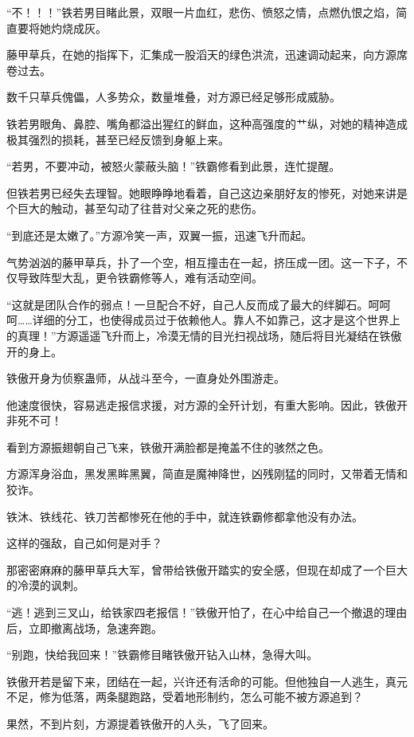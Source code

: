 \begin{this_body}
“不！！！”铁若男目睹此景，双眼一片血红，悲伤、愤怒之情，点燃仇恨之焰，简直要将她灼烧成灰。

藤甲草兵，在她的指挥下，汇集成一股滔天的绿色洪流，迅速调动起来，向方源席卷过去。

数千只草兵傀儡，人多势众，数量堆叠，对方源已经足够形成威胁。

铁若男眼角、鼻腔、嘴角都溢出猩红的鲜血，这种高强度的艹纵，对她的精神造成极其强烈的损耗，甚至已经反馈到身躯上来。

“若男，不要冲动，被怒火蒙蔽头脑！”铁霸修看到此景，连忙提醒。

但铁若男已经失去理智。她眼睁睁地看着，自己这边亲朋好友的惨死，对她来讲是个巨大的触动，甚至勾动了往昔对父亲之死的悲伤。

“到底还是太嫩了。”方源冷笑一声，双翼一振，迅速飞升而起。

气势汹汹的藤甲草兵，扑了一个空，相互撞击在一起，挤压成一团。这一下子，不仅导致阵型大乱，更令铁霸修等人，难有活动空间。

“这就是团队合作的弱点！一旦配合不好，自己人反而成了最大的绊脚石。呵呵呵……详细的分工，也使得成员过于依赖他人。靠人不如靠己，这才是这个世界上的真理！”方源遥遥飞升而上，冷漠无情的目光扫视战场，随后将目光凝结在铁傲开的身上。

铁傲开身为侦察蛊师，从战斗至今，一直身处外围游走。

他速度很快，容易逃走报信求援，对方源的全歼计划，有重大影响。因此，铁傲开非死不可！

看到方源振翅朝自己飞来，铁傲开满脸都是掩盖不住的骇然之色。

方源浑身浴血，黑发黑眸黑翼，简直是魔神降世，凶残刚猛的同时，又带着无情和狡诈。

铁沐、铁线花、铁刀苦都惨死在他的手中，就连铁霸修都拿他没有办法。

这样的强敌，自己如何是对手？

那密密麻麻的藤甲草兵大军，曾带给铁傲开踏实的安全感，但现在却成了一个巨大的冷漠的讽刺。

“逃！逃到三叉山，给铁家四老报信！”铁傲开怕了，在心中给自己一个撤退的理由后，立即撤离战场，急速奔跑。

“别跑，快给我回来！”铁霸修目睹铁傲开钻入山林，急得大叫。

铁傲开若是留下来，团结在一起，兴许还有活命的可能。但他独自一人逃生，真元不足，修为低落，两条腿跑路，受着地形制约，怎么可能不被方源追到？

果然，不到片刻，方源提着铁傲开的人头，飞了回来。


\end{this_body}
